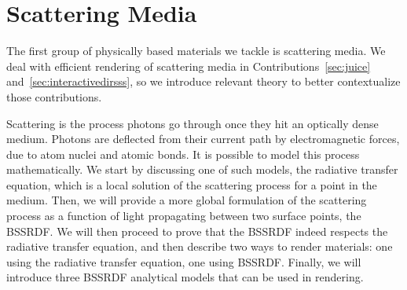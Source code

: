 \section{Scattering Media}
\label{sec:scatteringtheory}
The first group of physically based materials we tackle is scattering media. We deal with efficient rendering of scattering media in Contributions~\ref{sec:juice} and~\ref{sec:interactivedirsss}, so we introduce relevant theory to better contextualize those contributions.

Scattering is the process photons go through once they hit an optically dense medium. Photons are deflected from their current path by electromagnetic forces, due to atom nuclei and atomic bonds. It is possible to model this process mathematically. We start by discussing one of such models, the radiative transfer equation, which is a local solution of the scattering process for a point in the medium. Then, we will provide a more global formulation of the scattering process as a function of light propagating between two surface points, the BSSRDF. We will then proceed to prove that the BSSRDF indeed respects the radiative transfer equation, and then describe two ways to render materials: one using the radiative transfer equation, one using BSSRDF. Finally, we will introduce three BSSRDF analytical models that can be used in rendering.

